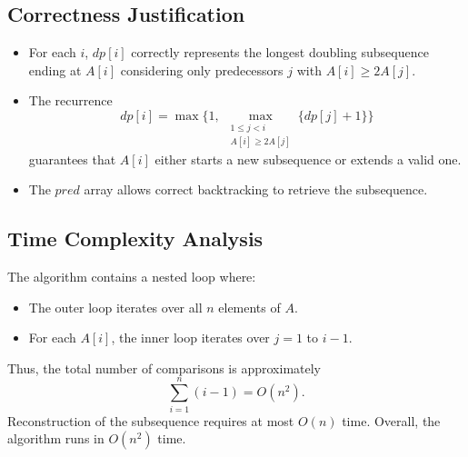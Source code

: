 \documentclass[letterpaper, 11pt]{article}
\newcommand{\1}{\mathds{1}}	%
\theoremstyle{definition}
\newenvironment{solution}{{\par\noindent\it Solution.}}{}
\begin{document}
\begin{solution}
    \subsection*{Correctness Justification}
    \begin{itemize}
        \item For each \(i\), \(dp[i]\) correctly represents the longest doubling subsequence ending at \(A[i]\) considering only predecessors \(j\) with \(A[i] \ge 2A[j]\).
        \item The recurrence
        \[
        dp[i] = \max\!\Biggl\{ 1,\ \max_{\substack{1 \leq j < i \\ A[i] \geq 2A[j]}} \{ dp[j]+1 \} \Biggr\}
        \]
        guarantees that \(A[i]\) either starts a new subsequence or extends a valid one.
        \item The \(\textit{pred}\) array allows correct backtracking to retrieve the subsequence.
    \end{itemize}
    
    \subsection*{Time Complexity Analysis}
    The algorithm contains a nested loop where:
    \begin{itemize}
        \item The outer loop iterates over all \(n\) elements of \(A\).
        \item For each \(A[i]\), the inner loop iterates over \(j = 1\) to \(i-1\).
    \end{itemize}
    Thus, the total number of comparisons is approximately
    \[
    \sum_{i=1}^{n} (i-1) = O(n^2).
    \]
    Reconstruction of the subsequence requires at most \(O(n)\) time. Overall, the algorithm runs in \(O(n^2)\) time.   
\end{solution}
\newpage
\end{document}
